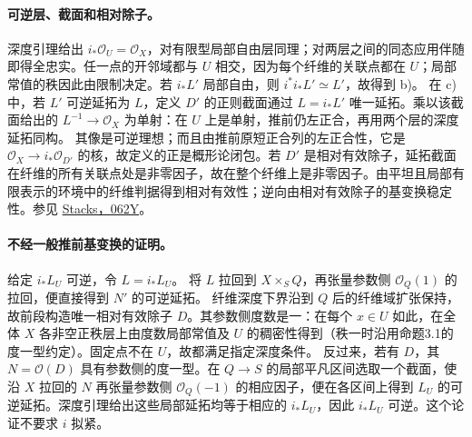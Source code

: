 \begingroup
\def\depth{\operatorname{depth}}
\def\Spec{\operatorname{Spec}}
\def\Ass{\operatorname{Ass}}
\def\OO{\mathcal O}
\def\FF{\mathcal F}
\def\JJ{\mathcal J}
\hypertarget{audit:L18-080}{}
\paragraph{可逆层、截面和相对除子。}
深度引理给出 \(i_*\OO_U=\OO_X\)，对有限型局部自由层同理；对两层之间的同态应用伴随即得全忠实。任一点的开邻域都与 \(U\) 相交，因为每个纤维的关联点都在 \(U\)；局部常值的秩因此由限制决定。若 \(i_*L'\) 局部自由，则 \(i^*i_*L'\simeq L'\)，故得到 b)。
在 c) 中，若 \(L'\) 可逆延拓为 \(L\)，定义 \(D'\) 的正则截面通过 \(L=i_*L'\) 唯一延拓。乘以该截面给出的 \(L^{-1}\to\OO_X\) 为单射：在 \(U\) 上是单射，推前仍左正合，再用两个层的深度延拓同构。
其像是可逆理想；而且由推前原短正合列的左正合性，它是 \(\OO_X\to i_*\OO_{D'}\) 的核，故定义的正是概形论闭包。若 \(D'\) 是相对有效除子，延拓截面在纤维的所有关联点处是非零因子，故在整个纤维上是非零因子。由平坦且局部有限表示的环境中的纤维判据得到相对有效性；逆向由相对有效除子的基变换稳定性。参见 \href{https://stacks.math.columbia.edu/tag/062Y}{Stacks，062Y}。

\paragraph{不经一般推前基变换的证明。}
给定 \(i_*L_U\) 可逆，令 \(L=i_*L_U\)。
将 \(L\) 拉回到 \(X\times_S Q\)，再张量参数侧 \(\OO_Q(1)\) 的拉回，便直接得到 \(N'\) 的可逆延拓。
纤维深度下界沿到 \(Q\) 后的纤维域扩张保持，故前段构造唯一相对有效除子 \(D\)。其参数侧度数是一：在每个 \(x\in U\) 如此，在全体 \(X\) 各非空正秩层上由度数局部常值及 \(U\) 的稠密性得到（秩一时沿用命题3.1的度一型约定）。固定点不在 \(U\)，故都满足指定深度条件。
反过来，若有 \(D\)，其 \(N=\OO(D)\) 具有参数侧的度一型。在 \(Q\to S\) 的局部平凡区间选取一个截面，使沿 \(X\) 拉回的 \(N\) 再张量参数侧 \(\OO_Q(-1)\) 的相应因子，便在各区间上得到 \(L_U\) 的可逆延拓。深度引理给出这些局部延拓均等于相应的 \(i_*L_U\)，因此 \(i_*L_U\) 可逆。这个论证不要求 \(i\) 拟紧。
\par\endgroup

\begingroup
\def\depth{\operatorname{depth}}
\def\Spec{\operatorname{Spec}}
\def\Ass{\operatorname{Ass}}
\def\OO{\mathcal O}
\def\FF{\mathcal F}
\def\JJ{\mathcal J}
\hypertarget{audit:L18-081}{}
